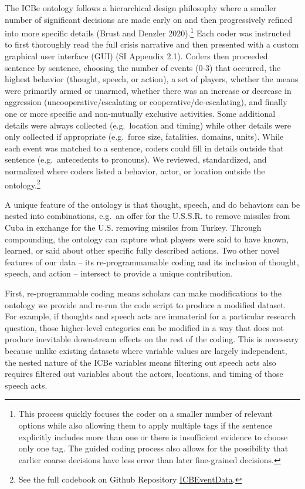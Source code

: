 \documentclass{article}
\begin{document}
The ICBe ontology follows a hierarchical design philosophy where a
smaller number of significant decisions are made early on and then
progressively refined into more specific details (Brust and Denzler
2020).\footnote{This process quickly focuses the coder on a smaller
  number of relevant options while also allowing them to apply multiple
  tags if the sentence explicitly includes more than one or there is
  insufficient evidence to choose only one tag. The guided coding
  process also allows for the possibility that earlier coarse decisions
  have less error than later fine-grained decisions.} Each coder was
instructed to first thoroughly read the full crisis narrative and then
presented with a custom graphical user interface (GUI) (SI Appendix
2.1). Coders then proceeded sentence by sentence, choosing the number of
events (0-3) that occurred, the highest behavior (thought, speech, or
action), a set of players, whether the means were primarily armed or
unarmed, whether there was an increase or decrease in aggression
(uncooperative/escalating or cooperative/de-escalating), and finally one
or more specific and non-mutually exclusive activities. Some additional
details were always collected (e.g.~location and timing) while other
details were only collected if appropriate (e.g.~force size, fatalities,
domains, units). While each event was matched to a sentence, coders
could fill in details outside that sentence (e.g.~antecedents to
pronouns). We reviewed, standardized, and normalized where coders listed
a behavior, actor, or location outside the ontology.\footnote{See the
  full codebook on Github Repository
  \href{https://urldefense.com/v3/__https://github.com/CenterForPeaceAndSecurityStudies/ICBEventData__;!!Mih3wA!WxDJtEczKfxGTh0S2Krunap8ReymFEL5iTWaSfOHeqlSdyfRx77zmjBSWO1OAm13$}{ICBEventData}.}

A unique feature of the ontology is that thought, speech, and do
behaviors can be nested into combinations, e.g.~an offer for the
U.S.S.R. to remove missiles from Cuba in exchange for the U.S. removing
missiles from Turkey. Through compounding, the ontology can capture what
players were said to have known, learned, or said about other specific
fully described actions. Two other novel features of our data -- its
re-programmamable coding and its inclusion of thought, speech, and
action -- intersect to provide a unique contribution.

First, re-programmable coding means scholars can make modifications to
the ontology we provide and re-run the code script to produce a modified
dataset. For example, if thoughts and speech acts are immaterial for a
particular research question, those higher-level categories can be
modified in a way that does not produce inevitable downstream effects on
the rest of the coding. This is necessary because unlike existing
datasets where variable values are largely independent, the nested
nature of the ICBe variables means filtering out speech acts also
requires filtered out variables about the actors, locations, and timing
of those speech acts.
\end{document}
